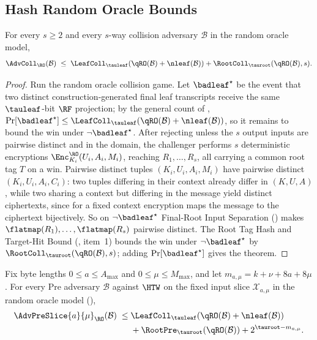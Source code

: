 \subsection{Hash Random Oracle Bounds}

\begin{theorem}
\label{thm:coll-ro}
For every $s \geq 2$ and every $s$-way collision
adversary $\mathcal{B}$ in the \TW{} random oracle model,
\[
  \AdvColl_{\RO}(\mathcal{B})
  \;\leq\;
  \LeafColl_{\tauleaf}(\qRO(\mathcal{B})+\nleaf(\mathcal{B}))
  + \RootColl_{\tauroot}(\qRO(\mathcal{B}), s).
\]
\end{theorem}

\begin{proof}
Run the random oracle collision game. Let $\badleaf^\star$ be the event
that two distinct construction-generated final leaf transcripts receive
the same $\tauleaf$-bit $\RF$ projection; by the general count
of ,
$\Pr[\badleaf^\star] \leq \LeafColl_{\tauleaf}(\qRO(\mathcal{B})+\nleaf(\mathcal{B}))$,
so it remains to bound the win under $\neg\badleaf^\star$. After rejecting
unless the $s$ output inputs are pairwise distinct and in the \TW{}
domain, the challenger performs $s$ deterministic encryptions
$\Enc_{K_i}^{\RO}(U_i,A_i,M_i)$, reaching $R_1,\dots,R_s$, all carrying a
common root tag $T$ on a win. Pairwise distinct tuples $(K_i,U_i,A_i,M_i)$
have pairwise distinct $(K_i,U_i,A_i,C_i)$: two tuples differing in their
context already differ in $(K,U,A)$, while two sharing a context but
differing in the message yield distinct ciphertexts, since for a fixed
context encryption maps the message to the ciphertext bijectively. So on
$\neg\badleaf^\star$ Final-Root Input Separation
() makes $\flatmap(R_1),\dots,\flatmap(R_s)$
pairwise distinct. The Root Tag Hash and Target-Hit Bound (,
item~1) bounds the win under $\neg\badleaf^\star$ by
$\RootColl_{\tauroot}(\qRO(\mathcal{B}),s)$; adding $\Pr[\badleaf^\star]$
gives the theorem.
\end{proof}

\begin{theorem}
\label{thm:pre-ro}
Fix byte lengths $0 \leq a \leq A_{\max}$ and
$0 \leq \mu \leq M_{\max}$, and let
$m_{a,\mu}=k+\nu+8a+8\mu$. For every Pre adversary
$\mathcal{B}$ against $\HTW$ on the fixed input slice
$\mathcal{X}_{a,\mu}$ in the \TW{} random oracle model
(),
\[
\begin{aligned}
  \AdvPreSlice{a}{\mu}_\RO(\mathcal{B})
  \;\leq\;&
  \LeafColl_{\tauleaf}(\qRO(\mathcal{B})+\nleaf(\mathcal{B})) \\
  &+ \RootPre_{\tauroot}(\qRO(\mathcal{B}))
  + 2^{\tauroot-m_{a,\mu}} .
\end{aligned}
\]
\end{theorem}

